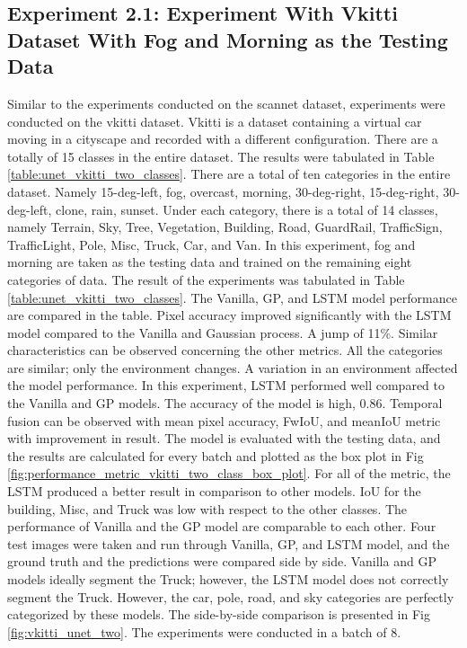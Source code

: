 	\newpage
	\newpage
	
	\subsection{Experiment 2.1: Experiment With Vkitti Dataset With Fog and Morning as the Testing Data}
	
	Similar to the experiments conducted on the scannet dataset, experiments were conducted on the vkitti dataset. Vkitti is a dataset containing a virtual car moving in a cityscape and recorded with a different configuration. There are a totally of 15 classes in the entire dataset. The results were tabulated in Table \ref{table:unet_vkitti_two_classes}. There are a total of ten categories in the entire dataset. Namely 15-deg-left, fog, overcast, morning, 30-deg-right, 15-deg-right, 30-deg-left, clone, rain, sunset. Under each category, there is a total of 14 classes, namely Terrain, Sky, Tree, Vegetation, Building, Road, GuardRail, TrafficSign, TrafficLight, Pole, Misc, Truck, Car, and Van. In this experiment, fog and morning are taken as the testing data and trained on the remaining eight categories of data.
	The result of the experiments was tabulated in Table \ref{table:unet_vkitti_two_classes}. The Vanilla, GP, and LSTM model performance are compared in the table. Pixel accuracy improved significantly with the LSTM model compared to the Vanilla and Gaussian process. A jump of 11\%. Similar characteristics can be observed concerning the other metrics. All the categories are similar; only the environment changes. A variation in an environment affected the model performance. In this experiment, LSTM performed well compared to the Vanilla and GP models. The accuracy of the model is high, 0.86. Temporal fusion can be observed with mean pixel accuracy, FwIoU, and meanIoU metric with improvement in result. The model is evaluated with the testing data, and the results are calculated for every batch and plotted as the box plot in Fig \ref{fig:performance_metric_vkitti_two_class_box_plot}. For all of the metric, the LSTM produced a better result in comparison to other models. IoU for the building, Misc, and Truck was low with respect to the other classes. The performance of Vanilla and the GP model are comparable to each other. Four test images were taken and run through Vanilla, GP, and LSTM model, and the ground truth and the predictions were compared side by side. Vanilla and GP models ideally segment the Truck; however, the LSTM model does not correctly segment the Truck. However, the car, pole, road, and sky categories are perfectly categorized by these models. The side-by-side comparison is presented in Fig \ref{fig:vkitti_unet_two}. The experiments were conducted in a batch of 8.
	
